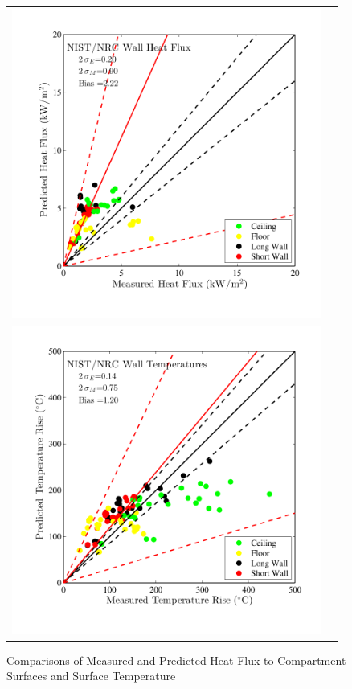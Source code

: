 \begin{figure}
\begin{center}
\begin{tabular}{lr}
\includegraphics[width=4in]{FIGURES/ScatterPlots/Wall_Heat_Flux}  & \\ 
\includegraphics[width=4in]{FIGURES/ScatterPlots/Wall_Temperature}
\end{tabular}
\end{center}
\caption{Comparisons of Measured and Predicted Heat Flux to Compartment Surfaces and Surface Temperature} \label{fig:Surface_Scatter}
\end{figure}

